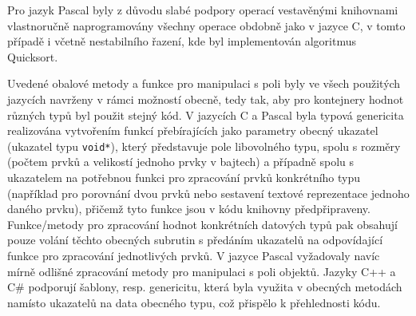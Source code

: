\documentclass[onepage, a4paper, 12pt]{bakalarka}
\begin{document}
Pro jazyk Pascal byly z důvodu slabé podpory operací vestavěnými knihovnami vlastnoručně naprogramovány všechny operace obdobně jako v jazyce C, v tomto případě i včetně nestabilního řazení, kde byl implementován algoritmus Quicksort.\par
Uvedené obalové metody a funkce pro manipulaci s poli byly ve všech použitých jazycích navrženy v rámci možností obecně, tedy tak, aby pro kontejnery hodnot různých typů byl použit stejný kód. V jazycích C a Pascal byla typová genericita realizována vytvořením funkcí přebírajících jako parametry obecný ukazatel (ukazatel typu \texttt{void*}), který představuje pole libovolného typu, spolu s rozměry (počtem prvků a velikostí jednoho prvky v bajtech) a případně spolu s ukazatelem na potřebnou funkci pro zpracování prvků konkrétního typu (například pro porovnání dvou prvků nebo sestavení textové reprezentace jednoho daného prvku), přičemž tyto funkce jsou v kódu knihovny předpřipraveny. Funkce/metody pro zpracování hodnot konkrétních datových typů pak obsahují pouze volání těchto obecných subrutin s předáním ukazatelů na odpovídající funkce pro zpracování jednotlivých prvků. V jazyce Pascal vyžadovaly navíc mírně odlišné zpracování metody pro manipulaci s poli objektů. Jazyky C++ a C\# podporují šablony, resp. genericitu, která byla využita v obecných metodách namísto ukazatelů na data obecného typu, což přispělo k přehlednosti kódu.
\end{document}
